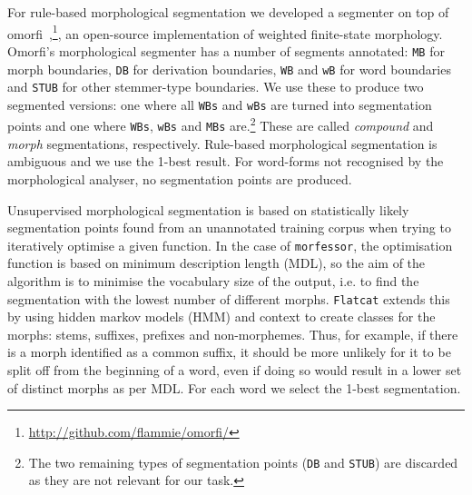 \documentclass[free]{flammie}
\begin{document}

For rule-based morphological segmentation we developed a segmenter on top of omorfi~\cite{pirinen2015omorfi},\footnote{\url{http://github.com/flammie/omorfi/}}, an open-source implementation of weighted finite-state morphology.  %
Omorfi's morphological segmenter has a number of segments annotated: \texttt{MB} for morph boundaries, \texttt{DB} for derivation boundaries, \texttt{WB} and \texttt{wB} for word boundaries and \texttt{STUB} for other stemmer-type boundaries.
We use these to produce two segmented versions: one where all \texttt{WBs} and \texttt{wBs} are turned into segmentation points and one where \texttt{WBs}, \texttt{wBs} and \texttt{MBs} are.\footnote{The two remaining types of segmentation points (\texttt{DB} and \texttt{STUB}) are discarded as they are not relevant for our task.}
These are called \textit{compound} and \textit{morph} segmentations, respectively. 
Rule-based morphological segmentation is ambiguous and we use the 1-best result.
For word-forms not recognised by the morphological analyser, no segmentation points are produced.


Unsupervised morphological segmentation is based on statistically likely segmentation points found from an unannotated training corpus when trying to iteratively optimise a given function.
In the case of \texttt{morfessor}, the optimisation function is based on minimum description length (MDL), so the aim of the algorithm is
to minimise the vocabulary size of the output, i.e. to find the segmentation with the lowest number of different morphs. 
\texttt{Flatcat} extends this by using hidden markov models (HMM) and context to create classes for the morphs: stems, suffixes, prefixes and non-morphemes.
Thus, for example, if there is a morph identified as a common suffix, it should be more unlikely for it to be split off from the beginning of a word, even if doing so would result in a lower set of distinct morphs as per MDL. 
For each word we select the 1-best segmentation.
\end{document}

